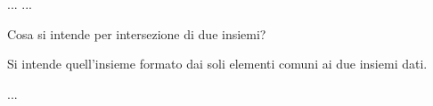 \documentclass[12pt]{exam}
\begin{document}
...
\printanswers
...
\begin{questions}
\question
Cosa si intende per intersezione
di due insiemi?
\begin{solution}[3cm]
Si intende quell’insieme
formato dai soli elementi
comuni ai due insiemi
dati.
\end{solution}
...
\end{questions}
\vspace{2cm}
\begin{center}
\gradetable[h][questions]
\end{center}
\end{document}
